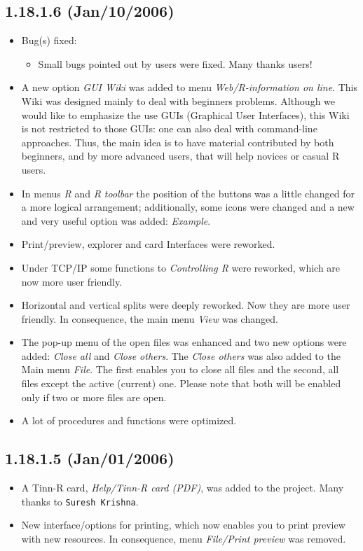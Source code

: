 \subsection{1.18.1.6 (Jan/10/2006)}

\begin{itemize}
  \item Bug(s) fixed:
    \begin{itemize}
      \item Small bugs pointed out by users were fixed. Many thanks users!
    \end{itemize}
  \item A new option \textit{GUI Wiki} was added to menu
    \textit{Web/R-information on line}. This Wiki was designed mainly
    to deal with \RR{} beginners problems. Although we
    would like to emphasize the use \RR{} GUIs (Graphical User
    Interfaces), this Wiki is not restricted to those GUIs: one
    can also deal with command-line approaches. Thus, the main idea is
    to have material contributed by both beginners, and by
    more advanced \RR{} users, that will help novices or casual
    R users.
  \item In menus \textit{R} and \textit{R toolbar} the position of
    the buttons was a little changed for a more logical arrangement;
    additionally, some icons were changed and a new and very useful option
    was added: \textit{Example}.
  \item Print/preview, \RR{} explorer and \RR{} card Interfaces
    were reworked.
  \item Under TCP/IP some functions to \textit{Controlling R} were
    reworked, which are now more user friendly.
  \item Horizontal and vertical splits were deeply reworked.
    Now they are more user friendly. In consequence, the main menu \textit{View}
    was changed.
  \item The pop-up menu of the open files was enhanced and two new
    options were added: \textit{Close all} and \textit{Close others}.
    The \textit{Close others} was also added to the Main menu \textit{File}.
    The first enables you to close all files and the second, all files except
    the active (current) one. Please note that both will be enabled only if
    two or more files are open.
  \item A lot of procedures and functions were optimized.
\end{itemize}


\subsection{1.18.1.5 (Jan/01/2006)}

\begin{itemize}
  \item A Tinn-R card, \textit{Help/Tinn-R card (PDF)}, was added
    to the project. Many thanks to \texttt{Suresh Krishna}.
  \item New interface/options for printing, which now enables you to
    print preview with new resources. In consequence, menu
    \textit{File/Print preview} was removed.
\end{itemize}
